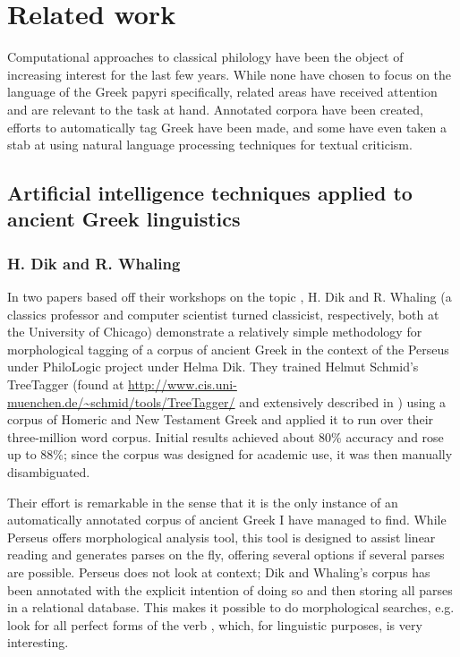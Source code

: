 \section{Related work}

Computational approaches to classical philology have been the object
of increasing interest for the last few years. While none have chosen
to focus on the language of the Greek papyri specifically, related
areas have received attention and are relevant to the task at
hand. Annotated corpora have been created, efforts to automatically
tag Greek have been made, and some have even taken a stab at using
natural language processing techniques for textual criticism. 


\subsection{Artificial intelligence techniques applied to ancient Greek linguistics}

\subsubsection{H. Dik and R. Whaling}
In two papers based off their workshops on the topic
\citep{dik2008,dik2009}, H. Dik and R. Whaling (a classics professor
and computer scientist turned classicist, respectively, both at the
University of Chicago) demonstrate a relatively simple methodology for
morphological tagging of a corpus of ancient Greek in the context of
the Perseus under PhiloLogic project under Helma Dik.  They trained
Helmut Schmid's TreeTagger (found at
\url{http://www.cis.uni-muenchen.de/~schmid/tools/TreeTagger/} and
extensively described in \cite{schmid1994,schmid1995}) using a corpus
of Homeric and New Testament Greek and applied it to run over their
three-million word corpus. Initial results achieved about 80\%
accuracy and rose up to 88\%; since the corpus was designed for
academic use, it was then manually disambiguated.

Their effort is remarkable in the sense that it is the only instance
of an automatically annotated corpus of ancient Greek I have managed
to find. While Perseus offers morphological analysis tool, this tool
is designed to assist linear reading and generates parses on the fly,
offering several options if several parses are possible. Perseus does
not look at context; Dik and Whaling's corpus has been annotated with
the explicit intention of doing so and then storing all parses in a
relational database. This makes it possible to do morphological
searches, e.g. look for all perfect forms of the verb
\Latin, which, for linguistic purposes, is very interesting.  

